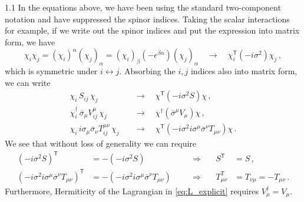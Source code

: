 \documentclass[a4paper,12pt]{article}
\def\T{\textsf{T}}
\begin{document}
\begin{spacing}{1.1}
In the equations above, we have been using the standard two-component notation and have suppressed the spinor indices. Taking the scalar interactions for example, if we write out the spinor indices and put the expression into matrix form, we have
\begin{equation}
\chi_i \chi_j = (\chi_i)^\alpha (\chi_j)_\alpha = (\chi_i)_\beta \left(-\epsilon^{\beta\alpha}\right) (\chi_j)_\alpha
\quad\longrightarrow\quad
\chi_i^\T \left( -i\sigma^2 \right) \chi_j \,,
\end{equation}
which is symmetric under $i \leftrightarrow j$. Absorbing the $i,j$ indices also into matrix form, we can write
\begin{subequations}\label{eqn:SVTmat}
\begin{align}
\chi_i\, S_{ij}\, \chi_j
&\quad\longrightarrow\quad
\chi^\T \left( -i\sigma^2 S \right) \chi \,, \\[5pt]
\chi_i^\dagger\, \overline\sigma_\mu V_{ij}^\mu\, \chi_j
&\quad\longrightarrow\quad
\chi^\dagger \left( \overline\sigma^\mu V_\mu \right) \chi \,, \\[5pt]
\chi_i\, i\sigma_\mu \overline\sigma_\nu T_{ij}^{\mu\nu}\, \chi_j
&\quad\longrightarrow\quad
\chi^\T \left( -i\sigma^2 i\sigma^\mu \overline\sigma^\nu T_{\mu\nu} \right) \chi \,.
\end{align}
\end{subequations}
We see that without loss of generality we can require
\begin{subequations}
\begin{alignat}{3}
\left( -i\sigma^2 S \right)^\T &= - \left( -i\sigma^2 S \right)
&&\quad\Longrightarrow\quad &
S^\T &= S \,, \\[5pt]
\left( -i\sigma^2 i\sigma^\mu \overline\sigma^\nu T_{\mu\nu} \right)^\T &= - \left( -i\sigma^2 i\sigma^\mu \overline\sigma^\nu T_{\mu\nu} \right)
&&\quad\Longrightarrow\quad &
T_{\mu\nu}^\T &= T_{\nu\mu} = - T_{\mu\nu} \,.
\end{alignat}
\end{subequations}
Furthermore, Hermiticity of the Lagrangian in \cref{eq:L_explicit} requires $V_\mu^\dagger = V_\mu$.


\end{spacing}
\end{document}
